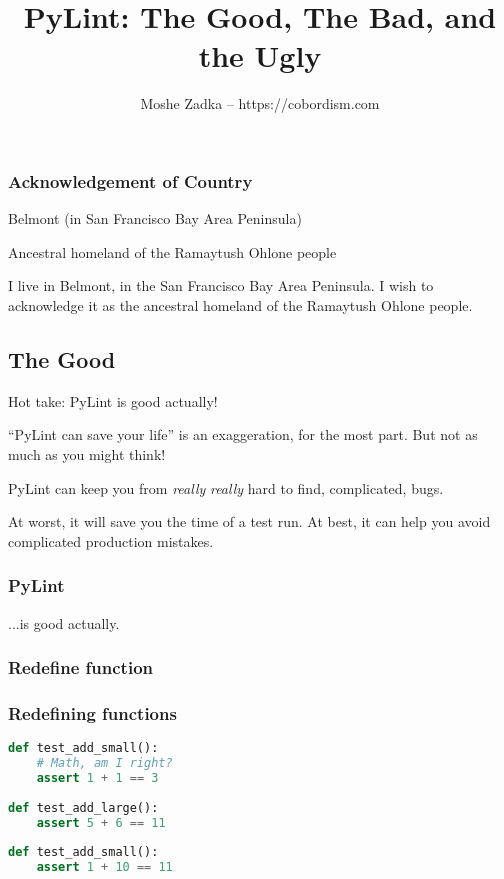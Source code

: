\documentclass{article}
\title{PyLint: The Good, The Bad, and the Ugly}
\author{Moshe Zadka -- https://cobordism.com}
\date{}
\begin{document}
\begin{titlepage}
\maketitle
\end{titlepage}

\frame{\titlepage}

\begin{frame}
\frametitle{Acknowledgement of Country}

Belmont (in San Francisco Bay Area Peninsula)

Ancestral homeland of the Ramaytush Ohlone people

\end{frame}

I live in Belmont, in the San Francisco Bay Area Peninsula. I wish to
acknowledge it as the ancestral homeland of the Ramaytush Ohlone people.

\hypertarget{the-good}{%
\subsection{The Good}\label{the-good}}

Hot take: PyLint is good actually!

``PyLint can save your life'' is an exaggeration, for the most part. But
not as much as you might think!

PyLint can keep you from \emph{really} \emph{really} hard to find,
complicated, bugs.

At worst, it will save you the time of a test run. At best, it can help
you avoid complicated production mistakes.

\begin{frame}[fragile]
\frametitle{PyLint}

\pause
...is good actually.
\end{frame}

\hypertarget{redefine-function}{%
\subsubsection{Redefine function}\label{redefine-function}}

\begin{frame}[fragile]
\frametitle{Redefining functions}

\begin{lstlisting}[language=Python]
def test_add_small():
    # Math, am I right?
    assert 1 + 1 == 3
    
def test_add_large():
    assert 5 + 6 == 11
    
def test_add_small():
    assert 1 + 10 == 11
\end{lstlisting}

\end{frame}
\end{document}
